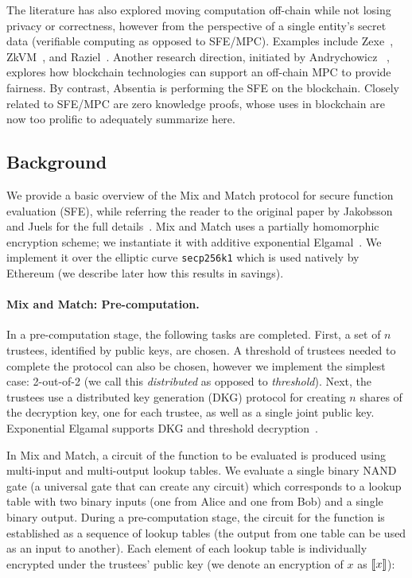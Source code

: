 
The literature has also explored moving computation off-chain while not losing privacy or correctness, however from the perspective of a single entity's secret data (\ie verifiable computing as opposed to SFE/MPC). Examples include Zexe~\cite{bowe2020zexe}, ZkVM~\cite{zkvm}, and Raziel~\cite{sanchez2018raziel}. Another research direction, initiated by Andrychowicz \etal~\cite{andrychowicz2014secure}, explores how blockchain technologies can support an off-chain MPC to provide fairness. By contrast, Absentia is performing the SFE on the blockchain. Closely related to SFE/MPC are zero knowledge proofs, whose uses in blockchain are now too prolific to adequately summarize here.




\subsection{Background}

We provide a basic overview of the Mix and Match protocol for secure function evaluation (SFE), while referring the reader to the original paper by Jakobsson and Juels for the full details~\cite{JJ00}. Mix and Match uses a partially homomorphic encryption scheme; we instantiate it with additive exponential Elgamal~\cite{CGS97}. We implement it over the elliptic curve \texttt{secp256k1} which is used natively by Ethereum (we describe later how this results in savings).

\paragraph{Mix and Match: Pre-computation.} 

In a pre-computation stage, the following tasks are completed. First, a set of $n$ trustees, identified by public keys, are chosen. A threshold of trustees needed to complete the protocol can also be chosen, however we implement the simplest case: 2-out-of-2 (we call this \emph{distributed} as opposed to \emph{threshold}). Next, the trustees use a distributed key generation (DKG) protocol for creating $n$ shares of the decryption key, one for each trustee, as well as a single joint public key. Exponential Elgamal supports DKG and threshold decryption~\cite{Ped91a}.

In Mix and Match, a circuit of the function to be evaluated is produced using multi-input and multi-output lookup tables. We evaluate a single binary NAND gate (a universal gate that can create any circuit) which corresponds to a lookup table with two binary inputs (one from Alice and one from Bob) and a single binary output. During a pre-computation stage, the circuit for the function is established as a sequence of lookup tables (the output from one table can be used as an input to another). Each element of each lookup table is individually encrypted under the trustees' public key (we denote an encryption of $x$ as $\llbracket x \rrbracket$):

